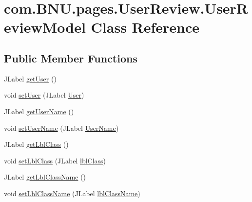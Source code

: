 \hypertarget{classcom_1_1_b_n_u_1_1pages_1_1_user_review_1_1_user_review_model}{}\section{com.\+B\+N\+U.\+pages.\+User\+Review.\+User\+Review\+Model Class Reference}
\label{classcom_1_1_b_n_u_1_1pages_1_1_user_review_1_1_user_review_model}
\subsection*{Public Member Functions}
\begin{DoxyCompactItemize}
\item 
J\+Label \mbox{\hyperlink{classcom_1_1_b_n_u_1_1pages_1_1_user_review_1_1_user_review_model_acdab2bfaadca7d69267a73ebcae78b45}{get\+User}} ()
\item 
void \mbox{\hyperlink{classcom_1_1_b_n_u_1_1pages_1_1_user_review_1_1_user_review_model_a813cfef1f2f6f8b98b14bfb884bf1437}{set\+User}} (J\+Label \mbox{\hyperlink{classcom_1_1_b_n_u_1_1pages_1_1_user_review_1_1_user_review_model_ac967b25fe8fd2fb0ec74509b21ed40fe}{User}})
\item 
J\+Label \mbox{\hyperlink{classcom_1_1_b_n_u_1_1pages_1_1_user_review_1_1_user_review_model_ac152bba9435df2524ed5eadd19e6dce8}{get\+User\+Name}} ()
\item 
void \mbox{\hyperlink{classcom_1_1_b_n_u_1_1pages_1_1_user_review_1_1_user_review_model_a63b41eb258243d99d0efc20178e5dff5}{set\+User\+Name}} (J\+Label \mbox{\hyperlink{classcom_1_1_b_n_u_1_1pages_1_1_user_review_1_1_user_review_model_ab0f8d05ee234354f99d90667a32f5e56}{User\+Name}})
\item 
J\+Label \mbox{\hyperlink{classcom_1_1_b_n_u_1_1pages_1_1_user_review_1_1_user_review_model_a70f6ce45805b3b911848631495bc70e7}{get\+Lbl\+Class}} ()
\item 
void \mbox{\hyperlink{classcom_1_1_b_n_u_1_1pages_1_1_user_review_1_1_user_review_model_ac7eb26b6b3e4ed69b269f1a0d0d1e887}{set\+Lbl\+Class}} (J\+Label \mbox{\hyperlink{classcom_1_1_b_n_u_1_1pages_1_1_user_review_1_1_user_review_model_a78a8effcdf299c2db639d978695e91e8}{lbl\+Class}})
\item 
J\+Label \mbox{\hyperlink{classcom_1_1_b_n_u_1_1pages_1_1_user_review_1_1_user_review_model_af4fca2e1bfabe3cd0c89096be8f179a7}{get\+Lbl\+Class\+Name}} ()
\item 
void \mbox{\hyperlink{classcom_1_1_b_n_u_1_1pages_1_1_user_review_1_1_user_review_model_ace3ee1770f99a92ece0aef2e4058114a}{set\+Lbl\+Class\+Name}} (J\+Label \mbox{\hyperlink{classcom_1_1_b_n_u_1_1pages_1_1_user_review_1_1_user_review_model_ad090b36696f4ac41ebe4ea2fa9bdc927}{lbl\+Class\+Name}})

\end{DoxyCompactItemize}
